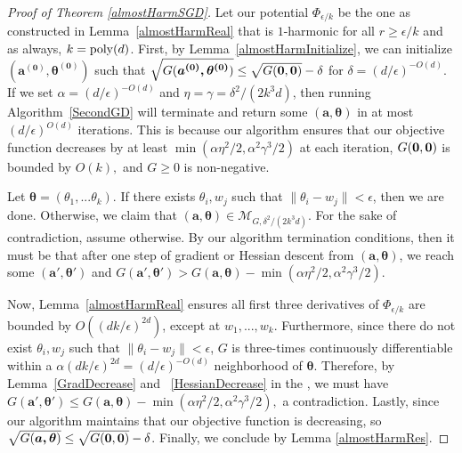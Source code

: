 \begin{proof}[Proof of Theorem \ref{almostHarmSGD}]
  Let our potential $\Phi_{\epsilon/k}$ be the one as constructed in Lemma~\ref{almostHarmReal} that is $1$-harmonic for all $r \geq \epsilon/k$ and as always, $k = \mathrm{poly}(d)$.  First, by Lemma~\ref{almostHarmInitialize}, we can initialize $\boldsymbol{(a^{(0)},\theta^{(0)})}$ such that $\sqrt{G(\boldsymbol{a^{(0)},\theta^{(0)}})} \leq \sqrt{G({\bf 0,0})} - \delta$ for $\delta = (d/\epsilon)^{-O(d)}$. If we set $\alpha = (d/\epsilon)^{-O(d)}$ and $\eta = \gamma = \delta^2/(2k^3d)$, then running Algorithm~\ref{SecondGD} will terminate and return some $(\boldsymbol{a,\theta})$ in at most $(d/\epsilon)^{O(d)}$ iterations. This is because our algorithm ensures that our objective function decreases by at least $\min(\alpha \eta^2/2, \alpha^2\gamma^3/2)$ at each iteration, $G({\bf 0, 0})$ is bounded by $O(k),$ and $G \geq 0$ is non-negative.

Let $\boldsymbol{\theta} = (\theta_1,...\theta_k)$. If there exists $\theta_i, w_j$ such that $\|\theta_i - w_j\| < \epsilon$, then we are done. Otherwise, we claim that $(\boldsymbol{a,\theta}) \in \mathcal{M}_{G, \delta^2/(2k^3d)}$. For the sake of contradiction, assume otherwise. By our algorithm termination conditions, then it must be that after one step of gradient or Hessian descent from $(\boldsymbol{a,\theta})$, we reach some $(\boldsymbol{a',\theta'})$ and $G(\boldsymbol{a',\theta'}) > G(\boldsymbol{a,\theta}) - \min(\alpha\eta^2/2,\alpha^2\gamma^3/2)$.

Now, Lemma~\ref{almostHarmReal} ensures all first three derivatives of
$\Phi_{\epsilon/k}$ are bounded by $O((dk/\epsilon)^{2d})$, except at
$w_1,...,w_k$. Furthermore, since there do not exist
$\theta_i, w_j$ such that $\|\theta_i - w_j\| <\epsilon$, $G$ is
three-times continuously differentiable within a
$\alpha (dk/\epsilon)^{2d} = (d/\epsilon)^{-O(d)}$ neighborhood of
$\boldsymbol{\theta}$. Therefore, by Lemma~\ref{GradDecrease} and
~\ref{HessianDecrease} in the , we must have
$G(\boldsymbol{a',\theta'}) \leq G(\boldsymbol{a,\theta}) -
\min(\alpha\eta^2/2,\alpha^2\gamma^3/2),$ a contradiction. Lastly,
since our algorithm maintains that our objective function is
decreasing, so
$\sqrt{G(\boldsymbol{a,\theta})} \leq \sqrt{G({\bf 0,0})} -
\delta$. Finally, we conclude by Lemma \ref{almostHarmRes}.
\end{proof}

